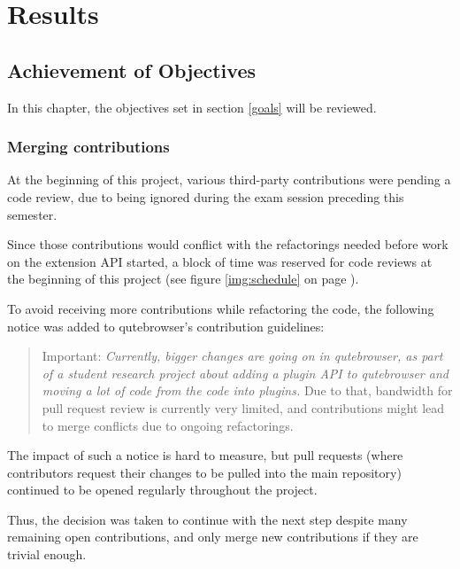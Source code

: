
\chapter{Results}
\label{ch:results}

\section{Achievement of Objectives}


In this chapter, the objectives set in section \ref{goals} will be reviewed.

\subsection{Merging contributions}
At the beginning of this project, various third-party contributions were pending
a code review, due to being ignored during the exam session preceding this
semester.

Since those contributions would conflict with the refactorings needed before
work on the extension API started, a block of time was reserved for code
reviews at the beginning of this project (see figure \ref{img:schedule} on page
\pageref{img:schedule}).

To avoid receiving more contributions while refactoring the code, the
following notice was added to qutebrowser's contribution guidelines:

\begin{quote}
Important: \emph{Currently, bigger changes are going on in qutebrowser, as
part of a student research project about adding a plugin API to qutebrowser
and moving a lot of code from the code into plugins.} Due to that, bandwidth
for pull request review is currently very limited, and contributions might lead
to merge conflicts due to ongoing refactorings.
\end{quote}

The impact of such a notice is hard to measure, but pull requests (where
contributors request their changes to be pulled into the main repository)
continued to be opened regularly throughout the project.

Thus, the decision was taken to continue with the next step despite many
remaining open contributions, and only merge new contributions if they are
trivial enough.

